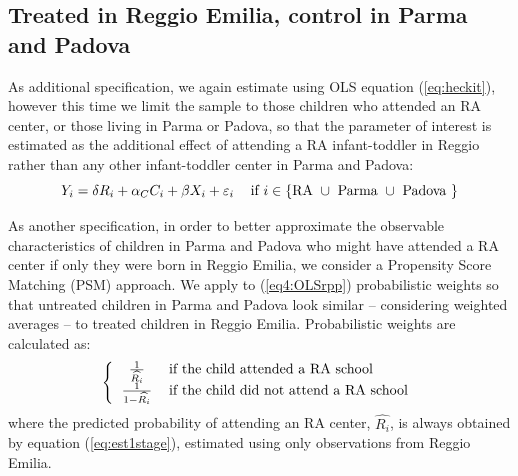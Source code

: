 \documentclass[12pt]{article}
\begin{document}
\subsection{Treated in Reggio Emilia, control in Parma and Padova}

As additional specification, we again estimate using OLS equation (\ref{eq:heckit}), however this time we limit the sample to those children who attended an RA center, or those living in Parma or Padova, so that the parameter of interest is estimated as the additional effect of attending a RA infant-toddler in Reggio rather than any other infant-toddler center in Parma and Padova:
%
\begin{equation}
Y_{i} = \delta R_{i} + \alpha_{C} C_{i} + \beta X_{i} + \varepsilon_{i}    \hspace{2ex} \text{ if } i \in \{\text{RA } \cup \text{ Parma } \cup \text{ Padova } \} \label{eq4:OLSrpp}
\end{equation} 

\medskip

As another specification, in order to better approximate the observable characteristics of children in Parma and Padova who might have attended a RA center if only they were born in Reggio Emilia, we consider a Propensity Score Matching (PSM) approach. 
We apply to (\ref{eq4:OLSrpp}) probabilistic weights so that untreated children in Parma and Padova look similar -- considering weighted averages -- to treated children in Reggio Emilia. 
Probabilistic weights are calculated as:%
\begin{equation}
\left\{
\begin{tabular}{cl}
$\frac{1}{\widehat{R_{i}}}$   & if the child attended a RA school \\
$\frac{1}{1-\widehat{R_{i}}}$ & if the child did not attend a RA school
\end{tabular}
\right. \label{eq:weights}
\end{equation}
%
where the predicted probability of attending an RA center, $\widehat{R_{i}}$, is always obtained by equation (\ref{eq:est1stage}), estimated using only observations from Reggio Emilia.
\end{document}
